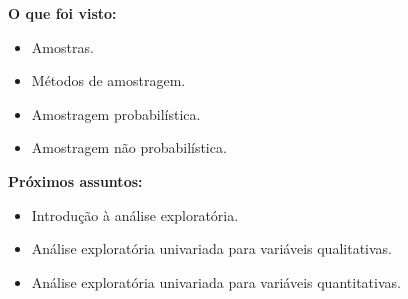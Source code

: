 \documentclass[
  ignorenonframetext,
  serif,
  professionalfont,
  usenames,
  dvipsnames,
  aspectratio = 169]{beamer}
\providecommand{\tightlist}{%
  \setlength{\itemsep}{0pt}\setlength{\parskip}{0pt}}
\renewcommand{\tightlist}{%
  \setlength{\itemsep}{0\baselineskip}
  \setlength{\parskip}{0.25\baselineskip}
}
\def\beginAHalfColumn{\begin{minipage}{0.49\textwidth}}%
\def\endColumns{\end{minipage}}%
\begin{document}
\begin{frame}{}
\protect\hypertarget{section}{}
\beginAHalfColumn

\textbf{O que foi visto:}

\begin{itemize}
\tightlist
\item
  Amostras.
\item
  Métodos de amostragem.
\item
  Amostragem probabilística.
\item
  Amostragem não probabilística.
\end{itemize}

\endColumns
\beginAHalfColumn

\textbf{Próximos assuntos:}

\begin{itemize}
\tightlist
\item
  Introdução à análise exploratória.
\item
  Análise exploratória univariada para variáveis qualitativas.
\item
  Análise exploratória univariada para variáveis quantitativas.
\end{itemize}

\endColumns
\end{frame}
\end{document}

